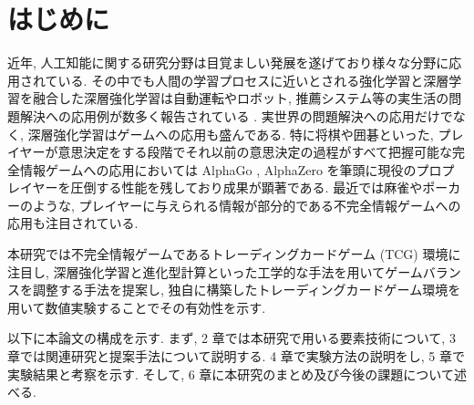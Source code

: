 \newpage
\changeindent{0cm}
\section{はじめに}
\changeindent{2cm}

近年, 人工知能に関する研究分野は目覚ましい発展を遂げており様々な分野に応用されている. その中でも人間の学習プロセスに近いとされる強化学習と深層学習を融合した深層強化学習は自動運転やロボット, 推薦システム等の実生活の問題解決への応用例が数多く報告されている \cite{Vehicle}\cite{robotics}\cite{recommendation}. 
実世界の問題解決への応用だけでなく, 深層強化学習はゲームへの応用も盛んである.
特に将棋や囲碁といった, プレイヤーが意思決定をする段階でそれ以前の意思決定の過程がすべて把握可能な完全情報ゲームへの応用においては AlphaGo \cite{AlphaGo}, AlphaZero \cite{AlphaZero} を筆頭に現役のプロプレイヤーを圧倒する性能を残しており成果が顕著である. 
最近では麻雀やポーカーのような, プレイヤーに与えられる情報が部分的である不完全情報ゲームへの応用も注目されている.
\par
本研究では不完全情報ゲームであるトレーディングカードゲーム (TCG) 環境に注目し, 深層強化学習と進化型計算といった工学的な手法を用いてゲームバランスを調整する手法を提案し, 独自に構築したトレーディングカードゲーム環境を用いて数値実験することでその有効性を示す. 
\par
以下に本論文の構成を示す.  まず, 2 章では本研究で用いる要素技術について, 3 章では関連研究と提案手法について説明する. 4 章で実験方法の説明をし, 5 章で実験結果と考察を示す. そして, 6 章に本研究のまとめ及び今後の課題について述べる.